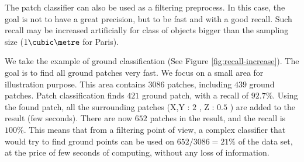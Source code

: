 		The patch classifier can also be used as a filtering preprocess.
		In this case, the goal is not to have a great precision, but to be fast and with a good recall.
		Such recall may be increased artificially for class of objects bigger than the sampling size ($1\cubic\metre$ for Paris).
		
		We take the example of ground classification (See Figure \ref{fig:recall-increase}). 
		The goal is to find all ground patches very fast.
		We focus on a small area for illustration purpose. This area contains $3086$ patches, including $439$ ground patches.
		Patch classification finds $421$ ground patch, 
		with a recall of $92.7$\%.
		Using the found patch, all the surrounding patches (X,Y : $2$ \meter, Z : $0.5$ \meter ) are added to the result (few seconds).
		There are now $652$ patches in the result, and the recall is $100$\%.
		This means that from a filtering point of view, a complex classifier that would try to find ground points can be used on $652/3086=21\%$ of the data set, at the price of few seconds of computing, without any loss of information.
		
		
					 	  
